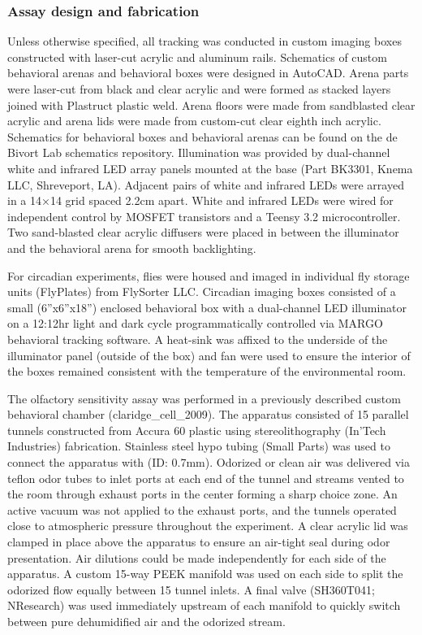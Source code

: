 \documentclass[12pt,letterpaper]{article}
\begin{document}
\subsubsection{Assay design and fabrication}

Unless otherwise specified, all tracking was conducted in custom imaging boxes constructed with laser-cut acrylic and aluminum rails. Schematics of custom behavioral arenas and behavioral boxes were designed in AutoCAD. Arena parts were laser-cut from black and clear acrylic and were formed as stacked layers joined with Plastruct plastic weld. Arena floors were made from sandblasted clear acrylic and arena lids were made from custom-cut clear eighth inch acrylic. Schematics for behavioral boxes and behavioral arenas can be found on the de Bivort Lab schematics repository. Illumination was provided by dual-channel white and infrared LED array panels mounted at the base (Part BK3301, Knema LLC, Shreveport, LA). Adjacent pairs of white and infrared LEDs were arrayed in a 14×14 grid spaced 2.2cm apart. White and infrared LEDs were wired for independent control by MOSFET transistors and a Teensy 3.2 microcontroller. Two sand-blasted clear acrylic diffusers were placed in between the illuminator and the behavioral arena for smooth backlighting.

For circadian experiments, flies were housed and imaged in individual fly storage units (FlyPlates) from FlySorter LLC. Circadian imaging boxes consisted of a small (6”x6”x18”) enclosed behavioral box with a dual-channel LED illuminator on a 12:12hr light and dark cycle programmatically controlled via MARGO behavioral tracking software. A heat-sink was affixed to the underside of the illuminator panel (outside of the box) and fan were used to ensure the interior of the boxes remained consistent with the temperature of the environmental room.

The olfactory sensitivity assay was performed in a previously described custom behavioral chamber (claridge_cell_2009). The apparatus consisted of 15 parallel tunnels constructed from Accura 60 plastic using stereolithography (In’Tech Industries) fabrication. Stainless steel hypo tubing (Small Parts) was used to connect the apparatus with (ID: 0.7mm). Odorized or clean air was delivered via teflon odor tubes to inlet ports at each end of the tunnel and streams vented to the room through exhaust ports in the center forming a sharp choice zone. An active vacuum was not applied to the exhaust ports, and the tunnels operated close to atmospheric pressure throughout the experiment. A clear acrylic lid was clamped in place above the apparatus to ensure an air-tight seal during odor presentation. Air dilutions could be made independently for each side of the apparatus. A custom 15-way PEEK manifold was used on each side to split the odorized flow equally between 15 tunnel inlets. A final valve (SH360T041; NResearch) was used immediately upstream of each manifold to quickly switch between pure dehumidified air and the odorized stream.
\end{document}
